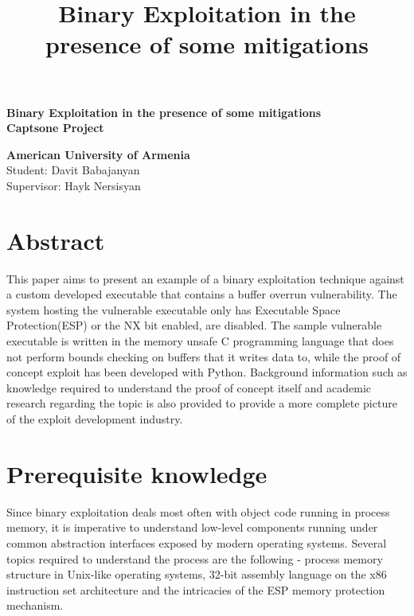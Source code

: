 \documentclass[a4paper,9pt]{report}
\date{}
\title{Binary Exploitation in the presence of some mitigations}
\begin{document}
\huge \vspace*{\fill}
\begin{center}
\textbf{Binary Exploitation in the presence of some mitigations} \\
\textbf{Captsone Project} \\
\end{center}

\Large
\begin{center}
\textbf{American University of Armenia}\\

Student: Davit Babajanyan\\

Supervisor: Hayk Nersisyan\\
\end{center}
\vspace*{\fill}

\setcounter{tocdepth}{3}
\tableofcontents

\chapter{Abstract}
\label{sec:org642ad76}

This paper aims to present an example of a binary exploitation technique against a custom developed executable that contains a buffer overrun vulnerability. The system hosting the vulnerable executable only has Executable Space Protection(ESP) or the NX bit enabled, are disabled. The sample vulnerable executable is written in the memory unsafe C programming language that does not perform bounds checking on buffers that it writes data to, while the proof of concept exploit has been developed with Python. Background information such as knowledge required to understand the proof of concept itself and academic research regarding the topic is also provided to provide a more complete picture of the exploit development industry.\\


\chapter{Prerequisite knowledge}
\label{sec:org3d71589}

Since binary exploitation deals most often with object code running in process memory, it is imperative to understand low-level components running under common abstraction interfaces exposed by modern operating systems. Several topics required to understand the process are the following - process memory structure in Unix-like operating systems, 32-bit assembly language on the x86 instruction set architecture and the intricacies of the ESP memory protection mechanism.\\
\end{document}
